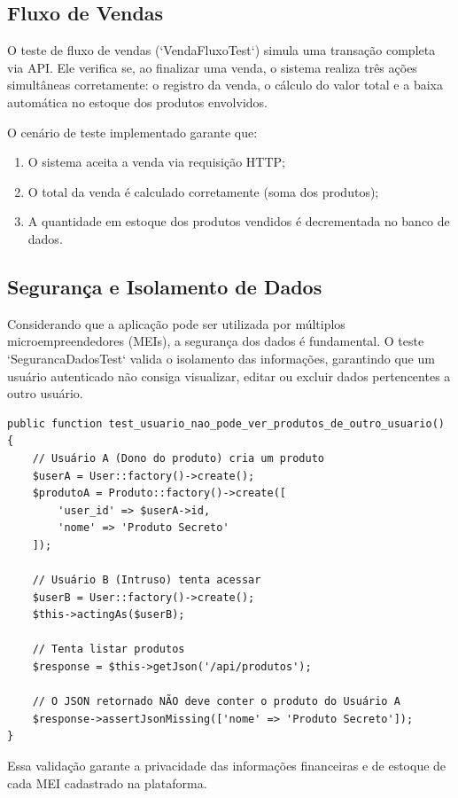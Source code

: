 \subsection{Fluxo de Vendas}

O teste de fluxo de vendas (`VendaFluxoTest`) simula uma transação completa via API. Ele verifica se, ao finalizar uma venda, o sistema realiza três ações simultâneas corretamente: o registro da venda, o cálculo do valor total e a baixa automática no estoque dos produtos envolvidos.

O cenário de teste implementado garante que:
\begin{enumerate}
    \item O sistema aceita a venda via requisição HTTP;
    \item O total da venda é calculado corretamente (soma dos produtos);
    \item A quantidade em estoque dos produtos vendidos é decrementada no banco de dados.
\end{enumerate}

\subsection{Segurança e Isolamento de Dados}

Considerando que a aplicação pode ser utilizada por múltiplos microempreendedores (MEIs), a segurança dos dados é fundamental. O teste `SegurancaDadosTest` valida o isolamento das informações, garantindo que um usuário autenticado não consiga visualizar, editar ou excluir dados pertencentes a outro usuário.

\begin{verbatim}
public function test_usuario_nao_pode_ver_produtos_de_outro_usuario()
{
    // Usuário A (Dono do produto) cria um produto
    $userA = User::factory()->create();
    $produtoA = Produto::factory()->create([
        'user_id' => $userA->id, 
        'nome' => 'Produto Secreto'
    ]);

    // Usuário B (Intruso) tenta acessar
    $userB = User::factory()->create();
    $this->actingAs($userB);

    // Tenta listar produtos
    $response = $this->getJson('/api/produtos');

    // O JSON retornado NÃO deve conter o produto do Usuário A
    $response->assertJsonMissing(['nome' => 'Produto Secreto']);
}
\end{verbatim}

Essa validação garante a privacidade das informações financeiras e de estoque de cada MEI cadastrado na plataforma.

